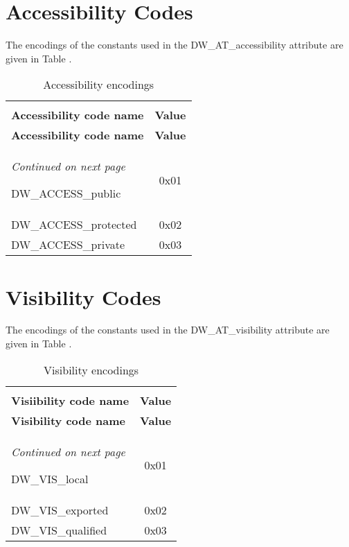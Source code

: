 \section{Accessibility Codes}
\label{datarep:accessibilitycodes}
The encodings of the constants used in the DW\_AT\_accessibility
attribute are given in 
Table .

\begin{centering}
\setlength{\extrarowheight}{0.1cm}
\begin{longtable}{l|c}
  \caption{Accessibility encodings} \label{tab:accessibilityencodings}\\
  \hline \\ \bfseries Accessibility code name&\bfseries Value \\ \hline
\endfirsthead
  \bfseries Accessibility code name&\bfseries Value\\ \hline
\endhead
  \hline \emph{Continued on next page}
\endfoot
  \hline
\endlastfoot

DW\_ACCESS\_public&0x01  \\
DW\_ACCESS\_protected&0x02 \\
DW\_ACCESS\_private&0x03 \\

\end{longtable}
\end{centering}


\section{Visibility Codes}
\label{datarep:visibilitycodes}
The encodings of the constants used in the 
DW\_AT\_visibility attribute are given in 
Table . 

\begin{centering}
\setlength{\extrarowheight}{0.1cm}
\begin{longtable}{l|c}
  \caption{Visibility encodings} \label{tab:visibilityencodings}\\
  \hline \\ \bfseries Visiibility code name&\bfseries Value \\ \hline
\endfirsthead
  \bfseries Visibility code name&\bfseries Value\\ \hline
\endhead
  \hline \emph{Continued on next page}
\endfoot
  \hline
\endlastfoot

DW\_VIS\_local&0x01 \\
DW\_VIS\_exported&0x02 \\
DW\_VIS\_qualified&0x03 \\

\end{longtable}
\end{centering}


